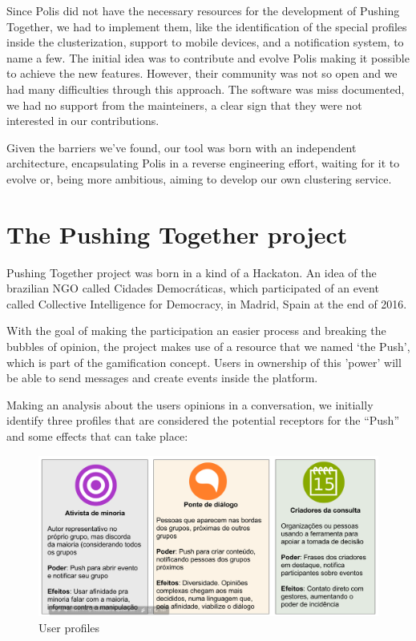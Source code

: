 \documentclass{llncs}
\begin{document}
  Since Polis did not have the necessary resources for the development of
  Pushing Together, we had to implement them, like the identification of
  the special profiles inside the clusterization, support to mobile devices, and a
  notification system, to name a few. The initial idea was to contribute and evolve Polis making it
  possible to achieve the new features. However, their community was not so
  open and we had many difficulties through this approach. The software was miss
  documented, we had no support from the mainteiners, a clear sign that they
  were not interested in our contributions.

  Given the barriers we’ve found, our tool was born with an independent
  architecture, encapsulating Polis in a reverse engineering effort, waiting
  for it to evolve or, being more ambitious, aiming to develop our own clustering
  service.

\section{The Pushing Together project}
\label{sec:pushingtogether}

  Pushing Together project was born in a kind of a Hackaton. An idea of the 
  brazilian NGO called Cidades Democráticas, which participated of an event
  called Collective Intelligence for Democracy, in Madrid, Spain at the end of
  2016.

  With the goal of making the participation an easier process and breaking the
  bubbles of opinion, the project makes use of a resource that we named ‘the Push’,
  which is part of the gamification concept. Users in ownership of this 'power'
  will be able to send messages and create events inside the platform.

  Making an analysis about the users opinions in a conversation, we initially
  identify three profiles that are considered the potential receptors for the “Push”
  and some effects that can take place: 

 \begin{figure}[H]
   \centering
     \includegraphics[keepaspectratio=true,scale=0.25]{images/userprofiles.png}
   \caption{User profiles}
   \label{fig:userprofiles}
 \end{figure}
\end{document}
